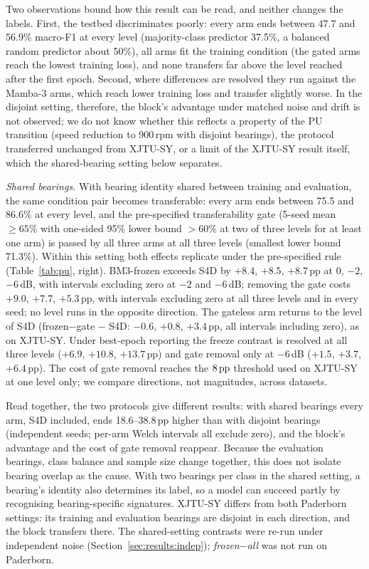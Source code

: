 Two observations bound how this result can be read, and neither changes the labels. First, the testbed discriminates poorly: every arm ends between 47.7 and 56.9\% macro-F1 at every level (majority-class predictor 37.5\%, a balanced random predictor about 50\%), all arms fit the training condition (the gated arms reach the lowest training loss), and none transfers far above the level reached after the first epoch. Second, where differences are resolved they run against the Mamba-3 arms, which reach lower training loss and transfer slightly worse. In the disjoint setting, therefore, the block's advantage under matched noise and drift is not observed; we do not know whether this reflects a property of the PU transition (speed reduction to 900\,rpm with disjoint bearings), the protocol transferred unchanged from XJTU-SY, or a limit of the XJTU-SY result itself, which the shared-bearing setting below separates.

\emph{Shared bearings.} With bearing identity shared between training and evaluation, the same condition pair becomes transferable: every arm ends between 75.5 and 86.6\% at every level, and the pre-specified transferability gate (5-seed mean $\geq 65\%$ with one-sided 95\% lower bound $> 60\%$ at two of three levels for at least one arm) is passed by all three arms at all three levels (smallest lower bound 71.3\%). Within this setting both effects replicate under the pre-specified rule (Table~\ref{tab:pu}, right). BM3-frozen exceeds S4D by $+8.4$, $+8.5$, $+8.7$\,pp at $0$, $-2$, $-6$\,dB, with intervals excluding zero at $-2$ and $-6$\,dB; removing the gate costs $+9.0$, $+7.7$, $+5.3$\,pp, with intervals excluding zero at all three levels and in every seed; no level runs in the opposite direction. The gateless arm returns to the level of S4D (frozen$-$gate $-$ S4D: $-0.6$, $+0.8$, $+3.4$\,pp, all intervals including zero), as on XJTU-SY. Under best-epoch reporting the freeze contrast is resolved at all three levels ($+6.9$, $+10.8$, $+13.7$\,pp) and gate removal only at $-6$\,dB ($+1.5$, $+3.7$, $+6.4$\,pp). The cost of gate removal reaches the $8\,\mathrm{pp}$ threshold used on XJTU-SY at one level only; we compare directions, not magnitudes, across datasets.

Read together, the two protocols give different results: with shared bearings every arm, S4D included, ends 18.6--38.8\,pp higher than with disjoint bearings (independent seeds; per-arm Welch intervals all exclude zero), and the block's advantage and the cost of gate removal reappear. Because the evaluation bearings, class balance and sample size change together, this does not isolate bearing overlap as the cause. With two bearings per class in the shared setting, a bearing's identity also determines its label, so a model can succeed partly by recognising bearing-specific signatures. XJTU-SY differs from both Paderborn settings: its training and evaluation bearings are disjoint in each direction, and the block transfers there. The shared-setting contrasts were re-run under independent noise (Section~\ref{sec:results:indep}); \emph{frozen$-$all} was not run on Paderborn.

